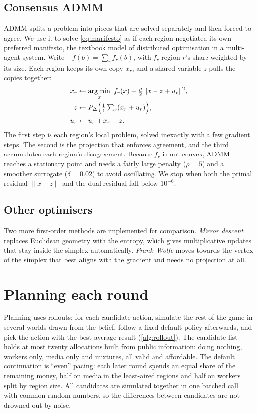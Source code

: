 \documentclass[11pt,a4paper,oneside]{report}
\newcommand{\simplex}{\Delta}
\DeclareMathOperator*{\argmin}{arg\,min}
\begin{document}
\subsection{Consensus ADMM}

ADMM splits a problem into pieces that are solved separately and then forced to agree. We
use it to solve \cref{eq:manifesto} as if each region negotiated its own preferred manifesto, the textbook
model of distributed optimisation in a multi-agent system. Write $-f(b) = \sum_r f_r(b)$, with $f_r$ region
$r$'s share weighted by its size. Each region keeps its own copy $x_r$, and a shared variable $z$ pulls the
copies together:
\begin{align}
  x_r &\leftarrow \argmin_{x}\ f_r(x) + \tfrac{\rho}{2}\,\lVert x - z + u_r \rVert^2, \\
  z   &\leftarrow P_{\simplex}\Bigl(\tfrac14 \textstyle\sum_r (x_r + u_r)\Bigr), \\
  u_r &\leftarrow u_r + x_r - z .
\end{align}
The first step is each region's local problem, solved inexactly with a few gradient steps. The second is
the projection that enforces agreement, and the third accumulates each region's disagreement. Because $f_r$
is not convex, ADMM reaches a stationary point and needs a fairly large penalty ($\rho = 5$) and a smoother
surrogate ($\delta = 0.02$) to avoid oscillating. We stop when both the primal residual
$\lVert x - z\rVert$ and the dual residual fall below $10^{-6}$.

\subsection{Other optimisers}

Two more first-order methods are implemented for comparison. \emph{Mirror descent} replaces Euclidean
geometry with the entropy, which gives multiplicative updates that stay inside the simplex
automatically. \emph{Frank--Wolfe} moves towards the vertex of the simplex that best
aligns with the gradient and needs no projection at all.

\section{Planning each round}

Planning uses rollouts: for each candidate action, simulate the rest of the game in
several worlds drawn from the belief, follow a fixed default policy afterwards, and pick the action with the
best average result (\cref{alg:rollout}). The candidate list holds at most twenty allocations built from
public information: doing nothing, workers only, media only and mixtures, all valid and affordable. The
default continuation is ``even'' pacing: each later round spends an equal share of the remaining money,
half on media in the least-aired regions and half on workers split by region size. All candidates are
simulated together in one batched call with common random numbers, so the differences between candidates
are not drowned out by noise.
\end{document}
